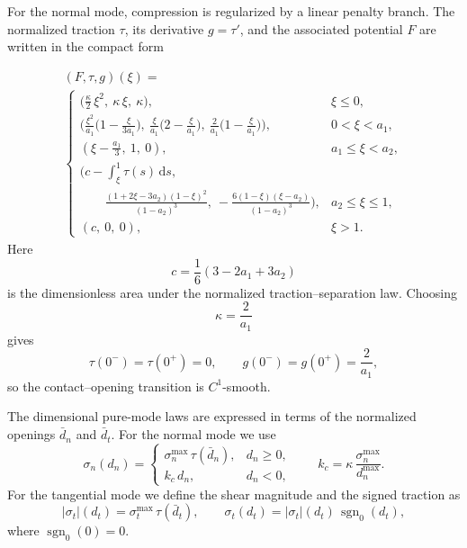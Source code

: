 \documentclass[smallextended]{svjour3}       %
\begin{document}
For the normal mode, compression is regularized by a linear penalty branch.
The normalized traction \(\tau\), its derivative \(g=\tau'\), and the
associated potential \(F\) are written in the compact form

\begin{multline}
	\label{eq:tau_law}
		(F,\tau,g)(\xi)= \\
		\begin{cases}
			\big(\tfrac{\kappa}{2}\,\xi^2,\ \kappa\,\xi,\ \kappa\big),
			& \xi\le 0,\\[2pt]
			\big(\tfrac{\xi^2}{a_1}\bigl(1-\tfrac{\xi}{3a_1}\bigr),\
			\tfrac{\xi}{a_1}\bigl(2-\tfrac{\xi}{a_1}\bigr),\
			\tfrac{2}{a_1}\bigl(1-\tfrac{\xi}{a_1}\bigr)\big),
			& 0<\xi<a_1,\\[4pt]
			(\xi-\tfrac{a_1}{3},\ 1,\ 0),
			& a_1\le \xi<a_2,\\[4pt]
			\Big(
			c-\!\!\int_{\xi}^{1}\! \tau(s)\,\mathrm ds,\\
			\qquad\frac{(1+2\xi-3a_2)(1-\xi)^2}{(1-a_2)^3},\
			-\frac{6(1-\xi)(\xi-a_2)}{(1-a_2)^3}
			\Big),
			& a_2\le\xi\le 1,\\[8pt]
			(c,\ 0,\ 0),
			& \xi>1.
		\end{cases}
\end{multline}
Here
\begin{equation}
	c=\frac{1}{6}\left(3-2a_1+3a_2\right)
	\label{eq:c_def}
\end{equation}
is the dimensionless area under the normalized traction--separation law.
Choosing
\[
\kappa=\frac{2}{a_1}
\]
gives
\[
\tau(0^-)=\tau(0^+)=0,
\qquad
g(0^-)=g(0^+)=\frac{2}{a_1},
\]
so the contact--opening transition is \(C^1\)-smooth.

The dimensional pure-mode laws are expressed in terms of the normalized
openings \(\bar d_n\) and \(\bar d_t\). For the normal mode we use
\begin{equation}
	\sigma_n(d_n)=
	\begin{cases}
		\sigma_n^{\max}\,\tau(\bar d_n), & d_n\ge 0,\\[3pt]
		k_c\,d_n, & d_n<0,
	\end{cases}
	\qquad
	k_c=\kappa\,\frac{\sigma_n^{\max}}{d_n^{\max}}.
	\label{eq:sigma_n_pure}
\end{equation}
For the tangential mode we define the shear magnitude and the signed traction
as
\begin{equation}
	|\sigma_t|(d_t)=\sigma_t^{\max}\,\tau(\bar d_t),
	\qquad
	\sigma_t(d_t)=|\sigma_t|(d_t)\,\operatorname{sgn}_0(d_t),
	\label{eq:sigma_t_pure}
\end{equation}
where \(\operatorname{sgn}_0(0)=0\).
\end{document}
